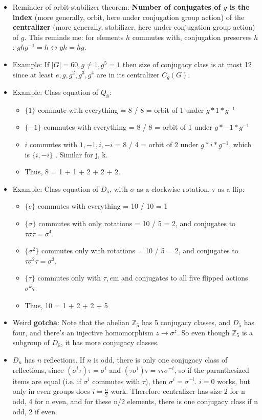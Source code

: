 \documentclass[11pt, oneside]{article}   	%
\begin{document}
\begin{itemize}
\item Reminder of orbit-stabilizer theorem: \textbf{Number of conjugates of $g$ is the index} (more generally, orbit, here under  conjugation group action) of the \textbf{centralizer} (more generally, stabilizer, here under conjugation group action) of $g$.  This reminds me: for elements $h$ commutes with, conjugation preserves $h$: $ghg^{-1} = h \leftrightarrow gh=hg$.
\item Example: If $|G| = 60, g \neq 1, g^5 = 1$ then size of conjugacy class is at most 12 since at least $e, g, g^2, g^3, g^4$ are in its centralizer $C_g(G)$.
\item Example: Class equation of $Q_8$:
  \begin{itemize}
  \item $\{1\}$ commute with everything = 8 / 8 = orbit of 1 under $g * 1 * g^{-1}$
  \item $\{-1\}$ commutes with everything = 8 / 8 = orbit of 1  under $g * -1 * g^{-1}$
  \item $i$ commutes with $1, -1, i, -i$ = 8 / 4 = orbit of 2 under $g * i * g^{-1}$, which is $\{i, -i\}$  .  Similar for j, k.
  \item Thus, 8 = 1 + 1 + 2 + 2 + 2.
  \end{itemize}
\item Example: Class equation of $D_5$, with $\sigma$ as a clockwise rotation, $\tau$ as a flip:
  \begin{itemize}
  \item $\{e\}$ commutes with everything = 10 / 10 = 1
  \item $\{\sigma\}$ commutes with only rotations = 10 / 5  = 2, and conjugates to $\tau\sigma\tau = \sigma^4$.
  \item $\{\sigma^2\}$ commutes only with rotations = 10 / 5 = 2, and conjugates to $\tau\sigma^2\tau = \sigma^3$.
  \item $\{\tau\}$ commutes only with $\tau, e$m and conjugates to all five flipped actions $\sigma^k\tau$.
  \item Thus, 10 = 1 + 2 + 2 + 5
  \end{itemize}
\item Weird \textbf{gotcha}: Note that the abelian $\mathbb{Z}_5$ has 5 conjugacy classes, and $D_5$ has four, and there's an injective homomorphism $z \rightarrow \sigma^z$.  So even though $\mathbb{Z}_5$ is a subgroup of $D_5$, it has more conjugacy classes.
\item $D_n$ has $n$ reflections.  If $n$ is odd, there is only one conjugacy class of reflections, since $(\sigma^i\tau)\tau = \sigma^i$ and $(\tau\sigma^i)\tau = \tau\tau\sigma^{-i}$, so if the paranthesized items are equal (i.e. if $\sigma^i$ commutes with $\tau$), then $\sigma^i = \sigma^{-i}$.  $i=0$ works, but only in even groups does $i=\frac{n}{2}$ work.  Therefore centralizer has size 2 for n odd, 4 for n even, and for these n/2 elements, there is one conjugacy class if n odd, 2 if even.

\end{itemize}
\end{document}
